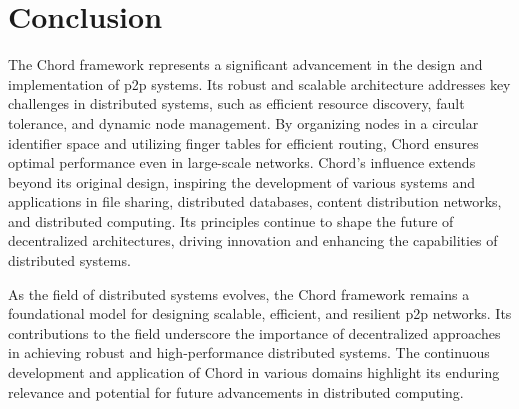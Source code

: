 \chapter{Conclusion}\label{chap:conclusion}
The Chord framework represents a significant advancement in the design and implementation of \gls{p2p} systems.
Its robust and scalable architecture addresses key challenges in distributed systems, such as efficient resource discovery, fault tolerance, and dynamic node management.
By organizing nodes in a circular identifier space and utilizing finger tables for efficient routing, Chord ensures optimal performance even in large-scale networks.
Chord's influence extends beyond its original design, inspiring the development of various systems and applications in file sharing, distributed databases, content distribution networks, and distributed computing.
Its principles continue to shape the future of decentralized architectures, driving innovation and enhancing the capabilities of distributed systems.

As the field of distributed systems evolves, the Chord framework remains a foundational model for designing scalable, efficient, and resilient \gls{p2p} networks.
Its contributions to the field underscore the importance of decentralized approaches in achieving robust and high-performance distributed systems.
The continuous development and application of Chord in various domains highlight its enduring relevance and potential for future advancements in distributed computing.